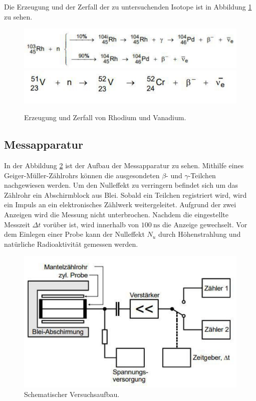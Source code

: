 Die Erzeugung und der Zerfall der zu untersuchenden Isotope ist in Abbildung \ref{fig:RhodiumVanadiumFormel} zu sehen.
\begin{figure}
    \centering
    \includegraphics[width=\textwidth]{content/RhodiumFormel.pdf}
    \includegraphics[width=\textwidth]{content/VanadiumFormel.pdf}
    \caption{Erzeugung und Zerfall von Rhodium und Vanadium. \cite{anleitung}}
    \label{fig:RhodiumVanadiumFormel}
\end{figure}

\subsection{Messapparatur}
In der Abbildung \ref{fig:AufbauSkizze} ist der Aufbau der Messapparatur zu sehen.
Mithilfe eines Geiger-Müller-Zählrohrs können die ausgesondeten $\beta$- und $\gamma$-Teilchen nachgewiesen werden.
Um den Nulleffekt zu verringern befindet sich um das Zählrohr ein Abschirmblock aus Blei.
Sobald ein Teilchen registriert wird, wird ein Impuls an ein elektronisches Zählwerk weitergeleitet.
Aufgrund der zwei Anzeigen wird die Messung nicht unterbrochen.
Nachdem die eingestellte Messzeit $\Delta t $ vorüber ist, wird innerhalb von $\SI{100}{\nano\second}$ die Anzeige gewechselt.
Vor dem Einlegen einer Probe kann der Nulleffekt $N_u$ durch Höhenstrahlung und natürliche Radioaktivität gemessen werden.
\begin{figure}
    \centering
    \includegraphics[width=\textwidth]{content/AufbauSkizze.pdf}
    \caption{Schematischer Versuchsaufbau.\cite{anleitung}}
    \label{fig:AufbauSkizze}
\end{figure}